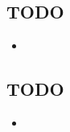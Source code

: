 \documentclass{report}
\begin{document}
\subsection{TODO}
\begin{itemize}
	\item 
\end{itemize}

\subsection{TODO}
\begin{itemize}
	\item 
\end{itemize}
\end{document}
